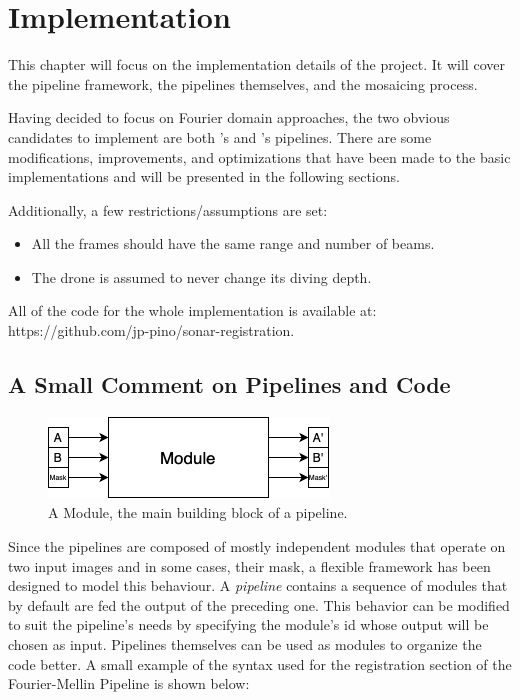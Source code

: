 \chapter{Implementation}
\label{chap:implementation}

This chapter will focus on the implementation details of the project. It will cover the pipeline framework, the pipelines themselves, and the mosaicing process.

Having decided to focus on Fourier domain approaches, the two obvious candidates to implement are both \citeauthor{Reddy1996}'s and \citeauthor{Hurtos2015}'s pipelines. There are some modifications, improvements, and optimizations that have been made to the basic implementations and will be presented in the following sections.

Additionally, a few restrictions/assumptions are set:

\begin{itemize}
    \item All the frames should have the same range and number of beams. 
    \item The drone is assumed to never change its diving depth.
\end{itemize}

All of the code for the whole implementation is available at: https://github.com/jp-pino/sonar-registration.

\section{A Small Comment on Pipelines and Code}

\begin{figure}[H] 
  \centering
  \includegraphics[width=.75\textwidth]{figures/Module.png}
  \caption{A Module, the main building block of a pipeline.}
\end{figure}

Since the pipelines are composed of mostly independent modules that operate on two input images and in some cases, their mask, a flexible framework has been designed to model this behaviour. A \textit{pipeline} contains a sequence of modules that by default are fed the output of the preceding one. This behavior can be modified to suit the pipeline's needs by specifying the module's id whose output will be chosen as input. Pipelines themselves can be used as modules to organize the code better. A small example of the syntax used for the registration section of the Fourier-Mellin Pipeline is shown below:

